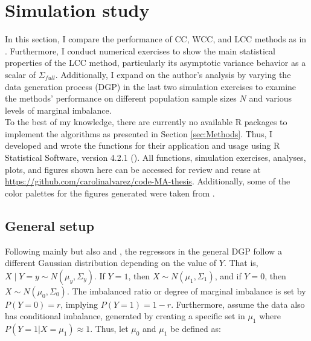 \section{Simulation study}
\label{sec:sim_study}



In this section, I compare the performance of CC, WCC, and LCC methods as in \textcite{hastie2014}. Furthermore, I conduct numerical exercises to show the main statistical properties of the LCC method, particularly its asymptotic variance behavior as a scalar of $\Sigma_{full}$. Additionally, I expand on the author's analysis by varying the data generation process (DGP) in the last two simulation exercises to examine the methods' performance on different population sample sizes $N$ and various levels of marginal imbalance.\\

To the best of my knowledge, there are currently no available R packages to implement the algorithms as presented in Section \ref{sec:Methods}. Thus, I developed and wrote the functions for their application and usage using R Statistical Software, version 4.2.1 (\cite{R}). All functions, simulation exercises, analyses, plots, and figures shown here can be accessed for review and reuse at \href{https://github.com/carolinalvarez/code-MA-thesis}{https://github.com/carolinalvarez/code-MA-thesis}. Additionally, some of the color palettes for the figures generated were taken from \textcite{wesanderson}.

\subsection{General setup}
\label{sec:sim_general}

Following mainly \textcite{hastie2014} but also \textcite{wang2020rare} and \textcite{han2020local}, the regressors in the general DGP follow a different Gaussian distribution depending on the value of $Y$. That is, $X \mid Y=y \sim N\left(\mu_y, \Sigma_y\right)$. If $Y=1$, then $X \sim N\left(\mu_1, \Sigma_1\right)$, and if $Y=0$, then $X \sim N\left(\mu_0, \Sigma_0\right)$. The imbalanced ratio or degree of marginal imbalance is set by $P(Y=0) = r$, implying $P(Y=1) = 1-r$. Furthermore, assume the data also has conditional imbalance, generated by creating a specific set in $\mu_1$ where $P(Y=1 | X = \mu_1) \approx 1$. Thus, let $\mu_0$ and $\mu_1$ be defined as:

